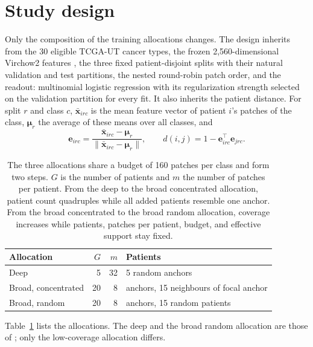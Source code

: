 \documentclass[11pt]{article}
\begin{document}
\section{Study design}
\label{sec:design}
Only the composition of the training allocations changes. The design inherits from \citet{queisler2026patientCoverage} the 30 eligible TCGA-UT cancer types, the frozen 2,560-dimensional Virchow2 features \citep{zimmermann2024virchow2}, the three fixed patient-disjoint splits with their natural validation and test partitions, the nested round-robin patch order, and the readout: multinomial logistic regression with its regularization strength selected on the validation partition for every fit. It also inherits the patient distance. For split $r$ and class $c$, $\bar{\mathbf x}_{irc}$ is the mean feature vector of patient $i$'s patches of the class, $\boldsymbol\mu_r$ the average of these means over all classes, and
\begin{equation}
 \mathbf e_{irc}=\frac{\bar{\mathbf x}_{irc}-\boldsymbol\mu_r}{\lVert\bar{\mathbf x}_{irc}-\boldsymbol\mu_r\rVert},
 \qquad
 d(i,j)=1-\mathbf e_{irc}^{\top}\mathbf e_{jrc}.
 \label{eq:distance}
\end{equation}

\begin{table}[htbp]
\centering
\renewcommand{\arraystretch}{1.15}
\begin{tabular}{@{}lrrl@{}}
\toprule
Allocation & $G$ & $m$ & Patients \\
\midrule
Deep & 5 & 32 & 5 random anchors \\
Broad, concentrated & 20 & 8 & anchors, 15 neighbours of focal anchor \\
Broad, random & 20 & 8 & anchors, 15 random patients \\
\bottomrule
\end{tabular}
\caption{The three allocations share a budget of 160 patches per class and form two steps. $G$ is the number of patients and $m$ the number of patches per patient. From the deep to the broad concentrated allocation, patient count quadruples while all added patients resemble one anchor. From the broad concentrated to the broad random allocation, coverage increases while patients, patches per patient, budget, and effective support stay fixed.}
\label{tab:allocations}
\end{table}

\noindent Table~\ref{tab:allocations} lists the allocations. The deep and the broad random allocation are those of \citet{queisler2026patientCoverage}; only the low-coverage allocation differs.
\end{document}

